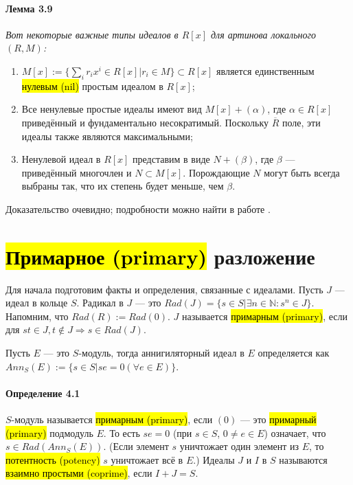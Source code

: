 \documentclass[a4paper,12pt]{article}
\begin{document}
\paragraph{Лемма 3.9}{\itshape
Вот некоторые важные типы идеалов в $R[x]$ для артинова локального $(R, M)$:

\renewcommand{\labelenumi}{(\asbuk{enumi})}
\begin{enumerate}
	\item $M[x] := \{\sum_i r_i x^i \in R[x] | r_i \in M \} \subset R[x]$ является единственным \hl{нулевым (nil)} простым идеалом в $R[x]$;
	\item Все ненулевые простые идеалы имеют вид $M[x] + (\alpha)$, где $\alpha \in R[x]$ приведённый и фундаментально несократимый. Поскольку $\overline{R}$ поле, эти идеалы также являются максимальными;
	\item Ненулевой идеал в $R[x]$ представим в виде $N + (\beta)$, где $\beta$ --- приведённый многочлен и $N \subset M[x]$. Порождающие $N$ могут быть всегда выбраны так, что их степень будет меньше, чем $\beta$.
\end{enumerate}
}

Доказательство очевидно; подробности можно найти в работе \cite{bib11}.

\section{\hl{Примарное (primary)} разложение}
Для начала подготовим факты и определения, связанные с идеалами. Пусть $J$ --- идеал в кольце $S$.
Радикал в $J$ --- это $Rad(J) = \{s \in S | \exists n \in \mathbb{N}: s^n \in J\}$. Напомним, что $Rad(R) := Rad(0)$. $J$ называется \hl{примарным (primary)}, если для $s t \in J, t \notin J \Rightarrow s \in Rad(J)$.

Пусть $E$ --- это $S$-модуль, тогда аннигиляторный идеал в $E$ определяется как $Ann_S(E) := \{s \in S | s e = 0 (\forall e \in E)\}$.

\paragraph{Определение 4.1}
$S$-модуль называется \hl{примарным (primary)}, если $(0)$ --- это \hl{примарный (primary)} подмодуль $E$. То есть $s e = 0$ (при $s \in S$, $0 \ne e \in E$) означает, что $s \in Rad(Ann_S(E))$. (Если элемент $s$ уничтожает один элемент из $E$, то \hl{потентность (potency)} $s$ уничтожает всё в $E$.) Идеалы $J$ и $I$ в $S$ называются \hl{взаимно простыми (coprime)}, если $I + J = S$.
\end{document}
